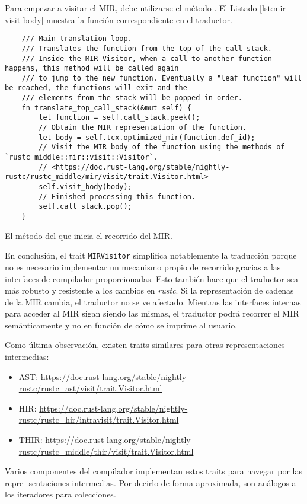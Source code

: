 Para empezar a visitar el MIR, debe utilizarse el método .
El Listado \ref{lst:mir-visit-body} muestra la función correspondiente en el traductor.

\begin{listing}[!htb]
  \begin{verbatim}
    /// Main translation loop.
    /// Translates the function from the top of the call stack.
    /// Inside the MIR Visitor, when a call to another function happens, this method will be called again
    /// to jump to the new function. Eventually a "leaf function" will be reached, the functions will exit and the
    /// elements from the stack will be popped in order.
    fn translate_top_call_stack(&mut self) {
        let function = self.call_stack.peek();
        // Obtain the MIR representation of the function.
        let body = self.tcx.optimized_mir(function.def_id);
        // Visit the MIR body of the function using the methods of `rustc_middle::mir::visit::Visitor`.
        // <https://doc.rust-lang.org/stable/nightly-rustc/rustc_middle/mir/visit/trait.Visitor.html>
        self.visit_body(body);
        // Finished processing this function.
        self.call_stack.pop();
    }    
  \end{verbatim}
  \caption{El método del  que inicia el recorrido del \acrshort{MIR}.}
  \label{lst:mir-visit-body}
\end{listing}

En conclusión, el trait \texttt{MIRVisitor} simplifica notablemente la traducción porque no es
necesario implementar un mecanismo propio de recorrido gracias a las interfaces de compilador
proporcionadas. Esto también hace que el traductor sea más robusto y resistente a los cambios
en \emph{rustc}. Si la representación de cadenas de la \acrshort{MIR} cambia, el traductor no se ve afectado.
Mientras las interfaces internas para acceder al \acrshort{MIR} sigan siendo las mismas, el traductor
podrá recorrer el \acrshort{MIR} semánticamente y no en función de cómo se imprime al usuario.

Como última observación, existen traits similares para otras representaciones intermedias:

\begin{itemize}
  \item \acrshort{AST}: \url{https://doc.rust-lang.org/stable/nightly-rustc/rustc_ast/visit/trait.Visitor.html}
  \item \acrshort{HIR}: \url{https://doc.rust-lang.org/stable/nightly-rustc/rustc_hir/intravisit/trait.Visitor.html}
  \item \acrshort{THIR}: \url{https://doc.rust-lang.org/stable/nightly-rustc/rustc_middle/thir/visit/trait.Visitor.html}
\end{itemize}

Varios componentes del compilador implementan estos traits para navegar por las repre-
sentaciones intermedias. Por decirlo de forma aproximada, son análogos a los iteradores para
colecciones.